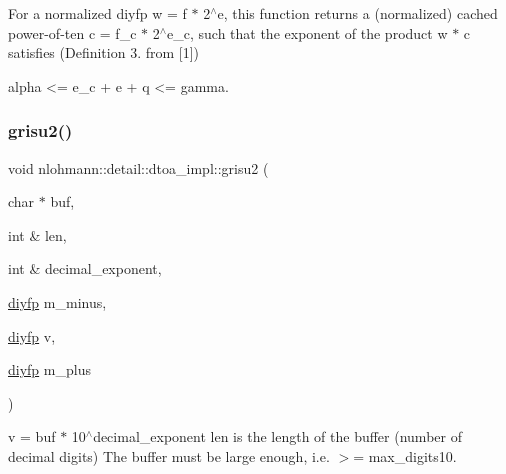 For a normalized diyfp w = f $\ast$ 2$^\wedge$e, this function returns a (normalized) cached power-\/of-\/ten c = f\+\_\+c $\ast$ 2$^\wedge$e\+\_\+c, such that the exponent of the product w $\ast$ c satisfies (Definition 3. from \mbox{[}1\mbox{]}) \begin{DoxyVerb} alpha <= e_c + e + q <= gamma.\end{DoxyVerb}
 \mbox{\label{namespacenlohmann_1_1detail_1_1dtoa__impl_a05b681dcb8569b9784c6dccfadb01633}} 
\subsubsection{\texorpdfstring{grisu2()}{grisu2()}\hspace{0.1cm}{\footnotesize\ttfamily [1/2]}}
{\footnotesize\ttfamily void nlohmann\+::detail\+::dtoa\+\_\+impl\+::grisu2 (\begin{DoxyParamCaption}\item[{char $\ast$}]{buf,  }\item[{int \&}]{len,  }\item[{int \&}]{decimal\+\_\+exponent,  }\item[{\mbox{\hyperlink{structnlohmann_1_1detail_1_1dtoa__impl_1_1diyfp}{diyfp}}}]{m\+\_\+minus,  }\item[{\mbox{\hyperlink{structnlohmann_1_1detail_1_1dtoa__impl_1_1diyfp}{diyfp}}}]{v,  }\item[{\mbox{\hyperlink{structnlohmann_1_1detail_1_1dtoa__impl_1_1diyfp}{diyfp}}}]{m\+\_\+plus }\end{DoxyParamCaption})\hspace{0.3cm}{\ttfamily [inline]}}

v = buf $\ast$ 10$^\wedge$decimal\+\_\+exponent len is the length of the buffer (number of decimal digits) The buffer must be large enough, i.\+e. $>$= max\+\_\+digits10. \mbox{\label{namespacenlohmann_1_1detail_1_1dtoa__impl_aab7a9670a4f4704a5d0347ad7588576b}} 
